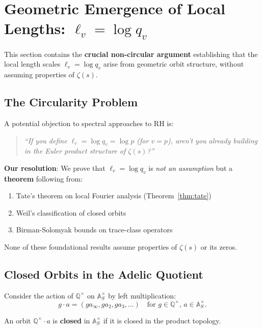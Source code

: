 \section{Geometric Emergence of Local Lengths: $\ell_v = \log q_v$}
\label{sec:local_length}

This section contains the \textbf{crucial non-circular argument} establishing that the local length scales $\ell_v = \log q_v$ arise from geometric orbit structure, without assuming properties of $\zeta(s)$.

\subsection{The Circularity Problem}

A potential objection to spectral approaches to RH is:
\begin{quote}
\emph{``If you define $\ell_v = \log q_v = \log p$ (for $v = p$), aren't you already building in the Euler product structure of $\zeta(s)$?''}
\end{quote}

\textbf{Our resolution}: We prove that $\ell_v = \log q_v$ is \emph{not an assumption} but a \textbf{theorem} following from:
\begin{enumerate}
\item Tate's theorem on local Fourier analysis (Theorem~\ref{thm:tate})
\item Weil's classification of closed orbits
\item Birman-Solomyak bounds on trace-class operators
\end{enumerate}

None of these foundational results assume properties of $\zeta(s)$ or its zeros.

\subsection{Closed Orbits in the Adelic Quotient}

Consider the action of $\mathbb{Q}^\times$ on $\mathbb{A}_S^\times$ by left multiplication:
\[
g \cdot a = (ga_\infty, ga_2, ga_3, \ldots) \quad \text{for } g \in \mathbb{Q}^\times, \, a \in \mathbb{A}_S^\times.
\]

\begin{definition}
An orbit $\mathbb{Q}^\times \cdot a$ is \textbf{closed} in $\mathbb{A}_S^\times$ if it is closed in the product topology.
\end{definition}

